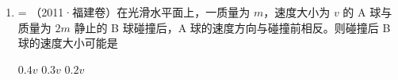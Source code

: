 \documentclass[\gkver]{gaokaozhenti}
\makeatletter
\newcommand{\tiinfo}[2]{{\small\color{gray}（#1）\textcolor{orange!85!black}{\nandu{#2}}}\hspace{0.4em}}
\newenvironment{tibody}
  {\begin{minipage}[t]{\linewidth}\@listdepth=\@ne\leavevmode\ignorespaces}
  {\end{minipage}}
\makeatother
\begin{document}
\begin{enumerate}[resume=tiku]
{$mv_{0} = mv_{1} + mv_{3}$

$\frac{1}{2}mv_{0}^{2} = \frac{1}{2}mv_{1}^{2} + \frac{1}{2}mv_{3}^{2}$

联立解得

$v_{1} = v_{0}$

设中子和氮核碰撞后中子速度为 $v_{4}$，由动量守恒定律和能量守恒定律可得

$mv_{0} = 14mv_{2} + mv_{4}$

$\frac{1}{2}mv_{0}^{2} = \frac{1}{2}\cdot 14mv_{2}^{2} + \frac{1}{2}mv_{4}^{2}$

联立解得

$v_{2} = \frac{2}{15}v_{0}$

可得

$v_{1} = v_{0} > v_{2}$

碰撞后氢核的动量为

$p_{H} = mv_{1} = mv_{0}$

氮核的动量为

$p_{N} = 14mv_{2} = \frac{28mv_{0}}{15}$

可得

$p_{N} > p_{H}$

碰撞后氢核的动能为

$E_{kH} = \frac{1}{2}mv_{1}^{2} = \frac{1}{2}mv_{0}^{2}$

氮核的动能为

$E_{kN} = \frac{1}{2}\cdot 14mv_{2}^{2} = \frac{28mv_{0}^{2}}{225}$

可得 $E_{kH} > E_{kN}$。

故 B 正确，ACD 错误。

故选 B。
}

\item
\begin{tibody}
\tiinfo{2011·福建卷}{2}在光滑水平面上，一质量为 $m$，速度大小为 $v$ 的 A 球与质量为 $2m$ 静止的 B 球碰撞后，A 球的速度方向与碰撞前相反。则碰撞后 B 球的速度大小可能是

{$0.4v$}
{$0.3v$}
{$0.2v$}
\end{tibody}



\end{enumerate}
\end{document}
